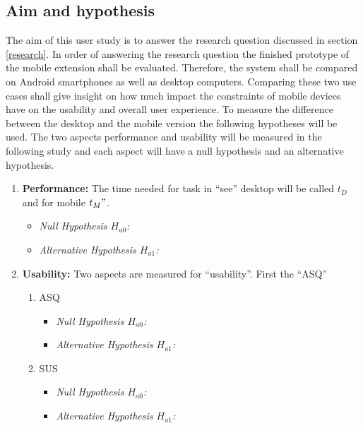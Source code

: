 \subsection{Aim and hypothesis}
\label{aim}
The aim of this user study is to answer the research question discussed in section \ref{research}.
In order of answering the research question the finished prototype of the mobile extension shall be evaluated. 
Therefore, the system shall be compared on Android smartphones as well as desktop computers. 
Comparing these two use cases shall give insight on how much impact the constraints of mobile devices have on the usability and overall user experience.
To measure the difference between the desktop and the mobile version the following hypotheses will be used.
The two aspects performance and usability will be measured in the following study and each aspect will have a null hypothesis and an alternative hypothesis.
\begin{enumerate}[{label=\alph*)}]
  \item \textbf{Performance:} The time needed for task in \enquote{\gls{see}} desktop will be called $t_D$ and for mobile $t_M"$.
  \begin{itemize}
    \item \textit{Null Hypothesis $H_{a0}$:}
    \item \textit{Alternative Hypothesis $H_{a1}$:}
  \end{itemize}
  \item \textbf{Usability:} Two aspects are measured for \enquote{\gls{usability}}. First the \enquote{\gls{ASQ}} 
  \begin{enumerate}[label=\roman*)]
    \item ASQ
    \begin{itemize}
      \item \textit{Null Hypothesis $H_{a0}$:}
      \item \textit{Alternative Hypothesis $H_{a1}$:}
    \end{itemize}
    \item SUS
    \begin{itemize}
      \item \textit{Null Hypothesis $H_{a0}$:}
      \item \textit{Alternative Hypothesis $H_{a1}$:}
    \end{itemize}
  \end{enumerate}
\end{enumerate}
